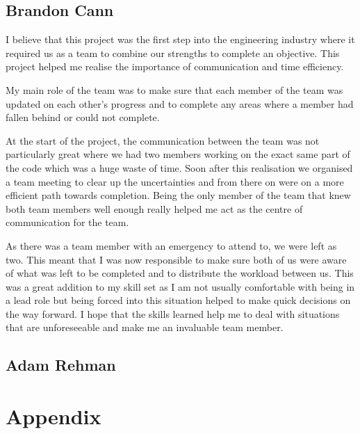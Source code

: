 \documentclass[12pt,a4paper]{article}
\begin{document}
\subsection{Brandon Cann}
I believe that this project was the first step into the engineering industry where it required us as a team to combine our 
strengths to complete an objective. This project helped me realise the importance of communication and time efficiency. 
\par
My main role of the team was to make sure that each member of the team was updated on each other’s progress and to complete 
any areas where a member had fallen behind or could not complete. 
\par
At the start of the project, the communication between the team was not particularly great where we had two members working 
on the exact same part of the code which was a huge waste of time. Soon after this realisation we organised a team meeting 
to clear up the uncertainties and from there on were on a more efficient path towards completion. Being the only member of 
the team that knew both team members well enough really helped me act as the centre of communication for the team. 
\par
As there was a team member with an emergency to attend to, we were left as two. This meant that I was now responsible to 
make sure both of us were aware of what was left to be completed and to distribute the workload between us. This was a great 
addition to my skill set as I am not usually comfortable with being in a lead role but being forced into this situation 
helped to make quick decisions on the way forward. I hope that the skills learned help me to deal with situations that are 
unforeseeable and make me an invaluable team member. 

\subsection{Adam Rehman}

\pagebreak
\section{Appendix}
\end{document}

